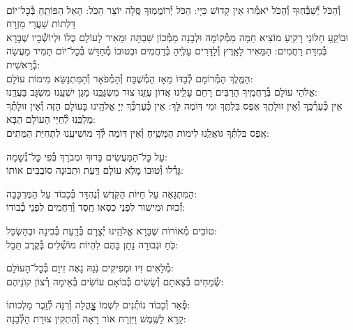 \documentclass[twoside, openany, parskip=half, 11pt]{book}
\begin{document}
\\
\shatz {}
וְ֯הַכֹּל יְ֯שַׁבְּ֯חֽוּךָ וְ֯הַכֹּל יֹאמְ֯רוּ אֵין קָדוֹשׁ כַּיָי:\hfill \break
\kahal הַכֹּל יְ֯רוֹמֲמֽוּךָ סֶּֽלָה יוֹצֵר הַכֹּל: הָאֵל הַפּוֹתֵֽחַ בְּ֯כׇל־יוֹם דַּלְתוֹת שַׁעֲרֵי מִזְרָח\\
\shatz וּבוֹקֵֽעַ חַלּוֹנֵי רָקִֽיעַ מוֹצִיא חַמָּה מִמְּ֯קוֹמָהּ וּלְבָנָה מִמְּ֯כוֹן שִׁבְתָּהּ
\kahal וּמֵאִיר לָעוֹלָם כֻּלּוֹ וּלְיוֹשְׁ֯בָיו שֶׁבָּרָא בְּ֯מִדַּת רַחֲמִים: \hfill \break
\shatz הַמֵּאִיר לָאָֽרֶץ וְ֯לַדָּרִים עָלֶֽיהָ בְּ֯רַחֲמִים וּבְטוּבוֹ מְ֯חַדֵּשׁ בְּ֯כׇל־יוֹם תָּמִיד מַעֲשֵׂה בְ֯רֵאשִׁית: \\
\kahal הַמֶּֽלֶךְ הַמְּ֯רוֹמָם לְ֯בַדּוֹ מֵאָז הַמְ֯שֻׁבָּח וְ֯הַמְ֯פֹאָר וְ֯הַמִּתְנַשֵּׂא מִימוֹת עוֹלָם: \\
\shatz אֱלֹהֵי עוֹלָם בְּ֯רַחֲמֶֽיךָ הָרַבִּים רַחֵם עָלֵֽינוּ אֲדוֹן עֻזֵּֽנוּ צוּר מִשְׂגַּבֵּֽנוּ מָגֵן יִשְׁעֵֽנוּ מִשְׂגָּב בַּעֲדֵֽנוּ: \\
\kahal אֵין כְּ֯עֶרְ֯כֶּֽךָ וְ֯אֵין זוּלָתֶֽךָ אֶפֶס בִּלְתֶּֽךָ וּמִי דּֽוֹמֶה לָּךְ: \hfill \break
\shatz אֵין כְּ֯עֶרְכְּ֯ךָ יְיָ אֱלֹהֵֽינוּ בָּעוֹלָם הַזֶּה וְ֯אֵין זוּלָתְ֯ךָ מַלְכֵּֽנוּ לְ֯חַיֵּי הָעוֹלָם הַבָּא:\\
\kahal אֶֽפֶס בִּלְתְּ֯ךָ גּוֹאֲלֵֽנוּ לִימוֹת הַמָּשִֽׁיחַ וְ֯אֵין דּֽוֹמֶה לְּ֯ךָ מוֹשִׁיעֵֽנוּ לִתְחִיַּת הַמֵּתִים:

\shatz {}
עַל כׇּל־הַמַּעֲשִׂים \hfill בָּרוּךְ וּמְבֹרָךְ בְּ֯פִי כׇּל־נְ֯שָׁמָה: \\
\kahal גָּדְ֯לוֹ וְ֯טוּבוֹ מָלֵא עוֹלָם \hfill דַּֽעַת וּתְבוּנָה סוֹבֲבִים אוֹתוֹ:

\shatz הַמִּתְגָּאֶה עַל חַיּוֹת הַקֹּֽדֶשׁ \hfill וְ֯נֶהְדָּר בְּ֯כָבוֹד עַל הַמֶּרְכָּבָה:\\
\kahal זְ֯כוּת וּמִישׁוֹר לִפְנֵי כִסְאוֹ \hfill חֶֽסֶד וְ֯רַחֲמִים לִפְנֵי כְ֯בוֹדוֹ:

\shatz טוֹבִים מְ֯אוֹרוֹת שֶׁבָּרָא אֱלֹהֵֽינוּ \hfill יְ֯צָרָם בְּ֯דַֽעַת בְּ֯בִינָה וּבְהַשְׂכֵּל:\\
\kahal כֹּֽחַ וּגְבוּרָה נָתַן בָּהֶם \hfill לִהְיוֹת מוֹשְׁ֯לִים בְּ֯קֶֽרֶב תֵּבֵל:

\shatz מְ֯לֵאִים זִיו וּמְפִיקִים נֹֽגַהּ \hfill נָאֶה זִיוָם בְּ֯כׇל־הָעוֹלָם: \\
\kahal שְׂ֯מֵחִים בְּ֯צֵאתָם וְ֯שָׂשִׂים בְּ֯בוֹאָם \hfill עוֹשִׂים בְּ֯אֵימָה רְ֯צוֹן קוׂנֵיהֶם:

\shatz פְּ֯אֵר וְ֯כָבוֹד נוֹתְ֯נִים לִשְׁמוֹ \hfill צׇׇׇׇׇׇׇׇהֳלָה וְ֯רִנָּה לְ֯זֵֽכֶר מַלְכוּתוֹ: \\
\kahal קָרָא לַשֶּֽׁמֶשׁ וַיִּזְרַח אוֹר \hfill רָאָה וְ֯הִתְקִין צוּרַת הַלְּ֯בָנָה:
\end{document}
